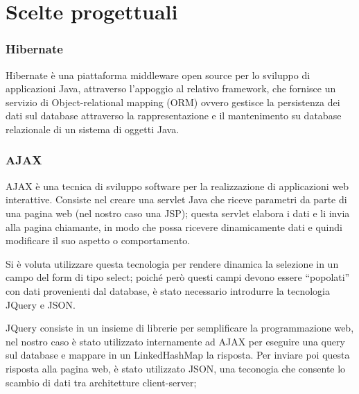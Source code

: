 \documentclass[a4paper,10pt]{article}
\begin{document}
\part{Scelte progettuali}

\section{Hibernate}
Hibernate \`e una piattaforma middleware open source per lo sviluppo di applicazioni Java, 
attraverso l'appoggio al relativo framework, che fornisce un servizio di Object-relational mapping (ORM) ovvero gestisce la persistenza dei dati 
sul database attraverso la rappresentazione e il mantenimento su database relazionale di un sistema di oggetti Java.

\section{AJAX}
AJAX è una tecnica di sviluppo software per la realizzazione di applicazioni web interattive. Consiste nel creare una servlet Java che riceve parametri da parte 
di una pagina web (nel nostro caso una JSP); questa servlet elabora i dati e li invia alla pagina chiamante, 
in modo che possa ricevere dinamicamente dati e quindi modificare il suo aspetto o comportamento.

Si è voluta utilizzare questa tecnologia per rendere dinamica la selezione in un campo del form di tipo select; 
poiché però questi campi devono essere ``popolati'' con dati provenienti dal database, è stato necessario introdurre la tecnologia JQuery e JSON.

JQuery consiste in un insieme di librerie per semplificare la programmazione web, nel nostro caso è stato utilizzato internamente ad 
AJAX per eseguire una query sul database e mappare in un LinkedHashMap la risposta. Per inviare poi questa risposta alla pagina web, è stato utilizzato JSON, 
una teconogia che consente lo scambio di dati tra architetture client-server;
\end{document}
